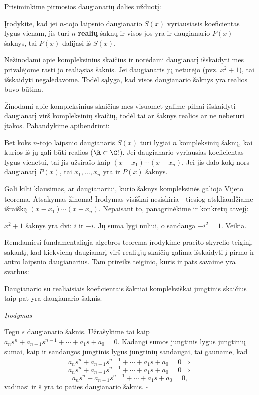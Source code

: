 Prisiminkime pirmosios daugianarių dalies užduotį: 

Įrodykite, kad jei $n$-tojo laipsnio daugianario $S(x)$ vyriausiasis
koeficientas lygus vienam, jis turi $n$ \textbf{realių} šaknų ir visos jos
yra ir daugianario $P(x)$ šaknys, tai $P(x)$ dalijasi iš $S(x)$. 

Nežinodami apie kompleksinius skaičius ir norėdami daugianarį išskaidyti
mes privalėjome rasti jo realiąsias šaknis. Jei daugianaris jų neturėjo
(pvz. $x^2+1$), tai išskaidyti negalėdavome. Todėl sąlyga, kad visos
daugianario šaknys yra realios buvo būtina.

Žinodami apie kompleksinius skaičius mes visuomet galime pilnai išskaidyti
daugianarį virš kompleksinių skaičių, todėl tai ar šaknys realios ar ne
nebeturi įtakos. Pabandykime apibendrinti:

Bet koks $n$-tojo laipsnio daugianaris $S(x)$ turi lygiai $n$ kompleksinių
šaknų, kai kurios iš jų gali būti realios ($\R \subset \C$!). Jei
daugianario vyriausias koeficientas lygus vienetui, tai jis užsirašo kaip
$(x-x_1)\cdots(x-x_n)$. Jei jis dalo kokį nors daugianarį $P(x)$, tai $x_1,
\dots, x_n$ yra ir $P(x)$ šaknys. 

Gali kilti klausimas, ar daugianariui, kurio šaknys kompleksinės galioja
Vijeto teorema. Atsakymas žinoma! Įrodymas visiškai nesiskiria - tiesiog
atskliaudžiame išraišką $(x-x_1)\cdots(x-x_n)$. Nepaisant to, panagrinėkime
ir konkretų atvejį:

$x^2 + 1$ šaknys yra dvi: $i$ ir $-i$. Jų suma lygi nuliui, o sandauga
$-i^2 = 1$. Veikia.

Remdamiesi fundamentaliąja algebros teorema įrodykime praeito skyrelio
teiginį, sakantį, kad kiekvieną daugianarį virš realiųjų skaičių galima
išskaidyti į pirmo ir antro laipsnio daugianarius. Tam prireiks teiginio,
kuris ir pats savaime yra svarbus:

\begin{teig} Daugianario su realiaisiais koeficientais šakniai
  kompleksiškai jungtinis skaičius taip pat yra daugianario šaknis.
\end{teig}

\emph{Įrodymas}

Tegu $s$ daugianario šaknis. Užrašykime tai kaip $a_ns^n + a_{n-1}s^{n-1} +
\cdots + a_1s + a_0 = 0.$ Kadangi sumos jungtinis lygus jungtinių sumai,
kaip ir sandaugos jungtinis lygus jungtinių sandaugai, tai gauname, kad
$$\overline{a_ns^n + a_{n-1}s^{n-1} + \cdots + a_1s + a_0} = \overline{0}
\Rightarrow$$ $$\overline{a}_n\overline{s}^n +
\overline{a}_{n-1}\overline{s}^{n-1} + \cdots + \overline{a}_1\overline{s}
+ \overline{a_0} = 0 \Rightarrow$$ $$a_n\overline{s}^n +
a_{n-1}\overline{s}^{n-1} + \cdots + a_1\overline{s} + a_0 = 0,$$ vadinasi
ir $\overline{s}$ yra to paties daugianario šaknis. $\square$


